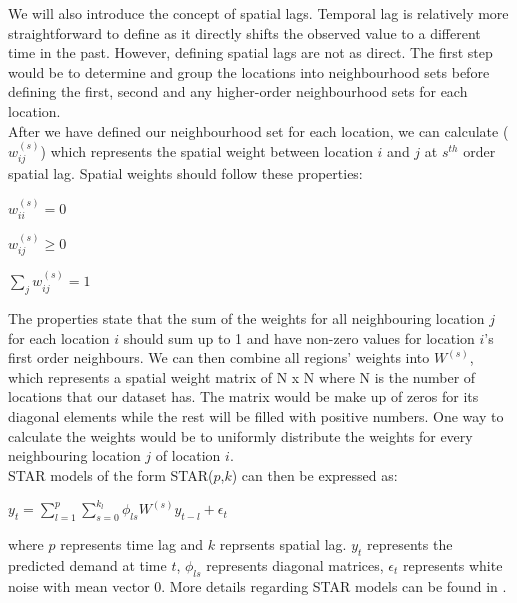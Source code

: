 \documentclass[nonblindrev,msom]{informs3} %
\begin{document}
\noindent We will also introduce the concept of spatial lags. Temporal lag is relatively more straightforward to define as it directly shifts the observed value to a different time in the past. However, defining spatial lags are not as direct. The first step would be to determine and group the locations into neighbourhood sets before defining the first, second and any higher-order neighbourhood sets for each location.  \\

\noindent After we have defined our neighbourhood set for each location, we can calculate ($w_{ij}^{(s)}$) which represents the spatial weight between location $i$ and $j$ at $s^{th}$ order spatial lag. Spatial weights should follow these properties: 

\begin{center}

	$\displaystyle w_{ii}^{(s)} = 0$
	
    $\displaystyle w_{ij}^{(s)} \geq 0$
    
    $\displaystyle \sum_{j} w_{ij}^{(s)} = 1$
\end{center}

\noindent The properties state that the sum of the weights for all neighbouring location $j$ for each location $i$ should sum up to 1 and have non-zero values for location $i$'s first order neighbours. We can then combine all regions' weights into $W^{(s)}$, which represents a spatial weight matrix of N x N where N is the number of locations that our dataset has. The matrix would be make up of zeros for its diagonal elements while the rest will be filled with positive numbers. One way to calculate the weights would be to uniformly distribute the weights for every neighbouring location $j$ of location $i$. \\

\newpage
\noindent STAR models of the form STAR($p$,$k$) can then be expressed as: \\

\begin{center}
    $\displaystyle y_{t} = \sum_{l=1}^{p}\sum_{s=0}^{k_l}\phi_{ls} W^{(s)}y_{t-l} + \epsilon_{t}$
\end{center}

\noindent where $p$ represents time lag and $k$ reprsents spatial lag. $y_{t}$ represents the predicted demand at time $t$, $\phi_{ls}$ represents diagonal matrices, $\epsilon_{t}$ represents white noise with mean vector 0. 
More details regarding STAR models can be found in \cite{KURT20152537}.
\end{document}
